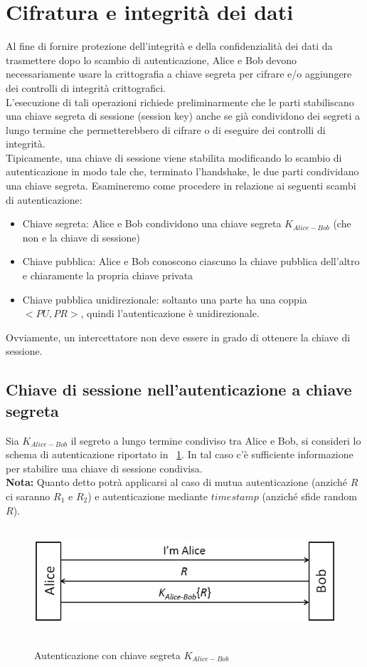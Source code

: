 \section{Cifratura e integrità dei dati}
Al fine di fornire protezione dell'integrità e della confidenzialità dei dati da trasmettere dopo lo scambio di autenticazione, Alice e Bob devono necessariamente usare la crittografia a chiave segreta per cifrare e/o aggiungere dei controlli di integrità crittografici.\\
L'esecuzione di tali operazioni richiede preliminarmente che le parti stabiliscano una chiave segreta di sessione (session key) anche se già condividono dei segreti a lungo termine che permetterebbero di cifrare o di eseguire dei controlli di integrità.\\
Tipicamente, una chiave di sessione viene stabilita modificando lo scambio di autenticazione in modo tale che, terminato l'handshake, le due parti condividano una chiave segreta. Esamineremo come procedere in relazione ai seguenti scambi di autenticazione:
\begin{itemize}
	\item Chiave segreta: Alice e Bob condividono una chiave segreta $K_{Alice-Bob}$ (che non e la chiave di sessione)
	\item Chiave pubblica: Alice e Bob conoscono ciascuno la chiave pubblica dell'altro e chiaramente la propria chiave privata
	\item Chiave pubblica unidirezionale: soltanto una parte ha una coppia $<PU,PR>$, quindi l'autenticazione è unidirezionale.
\end{itemize}
Ovviamente, un intercettatore non deve essere in grado di ottenere la chiave di sessione.
\subsection{Chiave di sessione nell'autenticazione a chiave segreta}
Sia $K_{Alice-Bob}$ il segreto a lungo termine condiviso tra Alice e Bob, si consideri lo schema di autenticazione riportato in \figurename~\ref{fig:ImgS61bis}. In tal caso c'è sufficiente informazione per stabilire una chiave di sessione condivisa. \\
\textbf{Nota:} Quanto detto potrà applicarsi al caso di mutua autenticazione (anziché $R$ ci saranno $R_{1}$ e $R_{2}$) e autenticazione mediante $timestamp$ (anziché sfide random $R$).  \\
\begin{figure}[htbp]
	\centering%
	\subfigure%
	{\includegraphics[height=4cm, width=12cm, keepaspectratio]{Immagini/autenticazione/ImgS61bis.png}}
	\caption{Autenticazione con chiave segreta $K_{Alice-Bob}$}\label{fig:ImgS61bis} 	
\end{figure}


